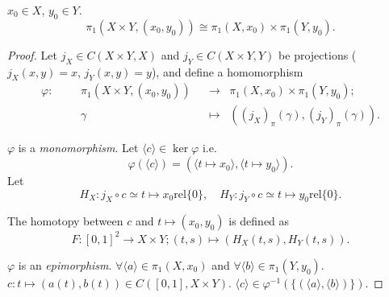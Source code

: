 \documentclass[openany, oneside, a5paper]{book}
\newcommand*{\rel}{\mathbin{\mathrm{rel}}}
\newcommand*{\pclass}[1]{\langle{#1}\rangle}    %
\begin{document}
\begin{theorem}%
    \label{theorem: Fundamental group of product space}
    $x_0 \in X$, $y_0 \in Y$.
    \begin{equation*}
        \pi_1(X \times Y, (x_0, y_0)) \cong \pi_1(X, x_0) \times \pi_1(Y, y_0).
    \end{equation*}
\end{theorem}
\begin{proof}
    Let $j_X \in C(X \times Y, X)$ and $j_Y \in C(X \times Y, Y)$ be projections ($j_X(x, y) = x$, $j_Y(x, y) = y$), and define a homomorphism
    \begin{align}
        \varphi\colon && &\pi_1(X \times Y, (x_0, y_0)) &&\to &\pi_1(X, x_0) \times \pi_1(Y, y_0); \\
        &&&\gamma &&\mapsto &((j_X)_\pi(\gamma), (j_Y)_\pi(\gamma)).
    \end{align}

    $\varphi$ is a \emph{monomorphism}.
    Let $\pclass{c} \in \ker \varphi$ i.e.\
    \begin{equation*}
        \varphi(\pclass{c}) = (\pclass{t \mapsto x_0}, \pclass{t \mapsto y_0}).
    \end{equation*}
    Let
    \begin{equation*}
       H_X \colon j_X \circ c \simeq  t \mapsto x_0 \rel \{0\},
       \quad
       H_Y \colon j_Y \circ c \simeq t \mapsto y_0\rel \{0\}.
    \end{equation*}

    The homotopy between $c$ and $t \mapsto (x_0, y_0)$ is defined as
    \begin{equation*}
        F \colon [0, 1]^2 \to X \times Y;
        (t, s) \mapsto (H_X(t, s), H_Y(t, s)).
    \end{equation*}

    $\varphi$ is an \emph{epimorphism}.
    $\forall \pclass{a} \in \pi_1(X, x_0)$ and $\forall \pclass{b} \in \pi_1(Y, y_0)$.
    $c\colon t \mapsto (a(t), b(t)) \in C([0, 1], X \times Y)$.
    $\pclass{c} \in \varphi^{-1}(\{(\pclass{a}, \pclass{b})\})$.
\end{proof}
\end{document}
